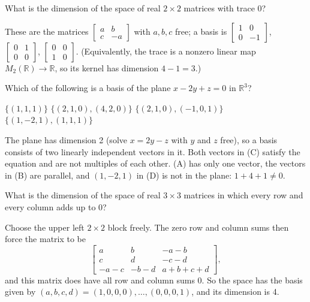 \begin{question}[id=basis-11]
What is the dimension of the space of real $2 \times 2$ matrices with trace 0?
\begin{solution}
These are the matrices $\begin{bmatrix} a & b \\ c & -a \end{bmatrix}$ with $a, b, c$ free; a basis is $\begin{bmatrix} 1 & 0 \\ 0 & -1 \end{bmatrix}$, $\begin{bmatrix} 0 & 1 \\ 0 & 0 \end{bmatrix}$, $\begin{bmatrix} 0 & 0 \\ 1 & 0 \end{bmatrix}$. (Equivalently, the trace is a nonzero linear map $M_2(\mathbb{R}) \to \mathbb{R}$, so its kernel has dimension $4 - 1 = 3$.)
\end{solution}
\end{question}

\begin{question}[id=basis-12]
Which of the following is a basis of the plane $x - 2y + z = 0$ in $\mathbb{R}^3$?
\begin{options}
  \option $\{(1, 1, 1)\}$
  \option $\{(2, 1, 0), (4, 2, 0)\}$
  \correct $\{(2, 1, 0), (-1, 0, 1)\}$
  \option $\{(1, -2, 1), (1, 1, 1)\}$
\end{options}
\begin{solution}
The plane has dimension 2 (solve $x = 2y - z$ with $y$ and $z$ free), so a basis consists of two linearly independent vectors in it. Both vectors in (C) satisfy the equation and are not multiples of each other. (A) has only one vector, the vectors in (B) are parallel, and $(1, -2, 1)$ in (D) is not in the plane: $1 + 4 + 1 \ne 0$.
\end{solution}
\end{question}

\begin{question}[id=basis-13, marks=2]
What is the dimension of the space of real $3 \times 3$ matrices in which every row and every column adds up to 0?
\begin{solution}
Choose the upper left $2 \times 2$ block freely. The zero row and column sums then force the matrix to be
\[
  \begin{bmatrix} a & b & -a - b \\ c & d & -c - d \\ -a - c & -b - d & a + b + c + d \end{bmatrix},
\]
and this matrix does have all row and column sums 0. So the space has the basis given by $(a, b, c, d) = (1, 0, 0, 0), \dots, (0, 0, 0, 1)$, and its dimension is 4.
\end{solution}
\end{question}

